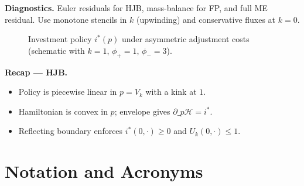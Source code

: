 \documentclass[11pt,letterpaper,oneside]{article}
\numberwithin{equation}{section}
\newcommand{\1}{\mathbf{1}}
\begin{document}
\begin{tcolorbox}[didacticstyle]
\textbf{Diagnostics.} Euler residuals for HJB, mass-balance for FP, and full ME residual. Use monotone stencils in $k$ (upwinding) and conservative fluxes at $k=0$.
\end{tcolorbox}

\begin{figure}[ht]
\centering
{}
\caption{Investment policy $i^*(p)$ under asymmetric adjustment costs (schematic with $k=1$, $\phi_+=1$, $\phi_-=3$).}
\end{figure}

\begin{tcolorbox}[didacticstyle]
\textbf{Recap — HJB.}
\begin{itemize}[leftmargin=1.15em,itemsep=0.2em]
  \item Policy is piecewise linear in $p=V_k$ with a kink at $1$.
  \item Hamiltonian is convex in $p$; envelope gives $\partial\_p\mathcal H=i^*$.
  \item Reflecting boundary enforces $i^*(0,\cdot)\ge0$ and $U_k(0,\cdot)\le1$.
\end{itemize}
\end{tcolorbox}

\section{Notation and Acronyms}
\end{document}
